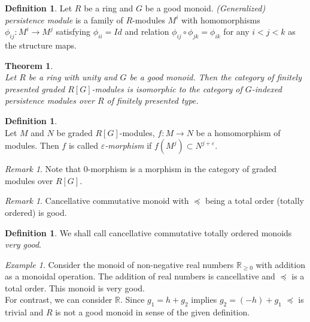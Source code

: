 \documentclass[a4paper, 12pt]{article}
\newcounter{stmcounter}[section]
\newcounter{thcounter}
\numberwithin{equation}{section}
\newtheorem{theorem}[thcounter]{Theorem}
\theoremstyle{definition}
\newtheorem{definition}[stmcounter]{Definition}
\theoremstyle{remark}
\newtheorem{remark}[stmcounter]{Remark}
\newtheorem{example}[stmcounter]{Example}
\newcommand{\define}[1]{{\textit{#1}}}
\renewcommand{\geq}{\geqslant}
\begin{document}
\begin{definition} {\cite[Definition 12]{Corbet18}}
  Let $R$ be a ring and $G$ be a good monoid. \define{(Generalized) persistence module} is a family of $R$-modules $M^i$ with homomorphisms $\phi_{ij} : M^i \to M^{j}$ satisfying $\phi_{ii} = Id$ and relation $\phi_{ij} \circ \phi_{jk} = \phi_{ik}$ for any $i < j < k$ as the structure maps.
\end{definition}

\begin{theorem} {\cite[Theorem 21]{Corbet18}}\\
  Let $R$ be a ring with unity and $G$ be a good monoid. Then the category of finitely presented graded $R[G]$-modules is isomorphic to the category of $G$-indexed persistence modules over $R$ of finitely presented type.
\end{theorem}

\begin{definition} {\cite[Definition 2.7]{GS16}}\\
  Let $M$ and $N$ be graded $R[G]$-modules, $f : M \to N$ be a homomorphism of modules. Then $f$ is called \define{$\varepsilon$-morphism} if $f(M^j) \subset N^{j+\varepsilon}$.
\end{definition}

\begin{remark}
  Note that $0$-morphism is a morphism in the category of graded modules over $R[G]$.
\end{remark}

\begin{remark}
  Cancellative commutative monoid with $\preceq$ being a total order (totally ordered) is good.
\end{remark}

\begin{definition}
  We shall call cancellative commutative totally ordered monoids \define{very good}.
\end{definition}

\begin{example}
  Consider the monoid of non-negative real numbers $\mathbb{R}_{\geq 0}$ with addition as a monoidal operation. The addition of real numbers is cancellative and $\preceq$ is a total order. This monoid is very good.\\

  For contrast, we can consider $\mathbb{R}$. Since $g_1 = h + g_2$ implies $g_2 = (-h) + g_1$ $\preceq$ is trivial and $R$ is not a good monoid in sense of the given definition.
\end{example} ~ \par
\end{document}
